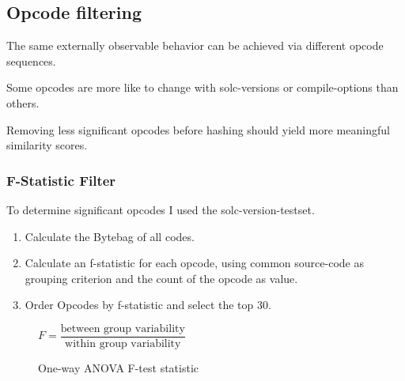 \documentclass[../main.tex]{subfiles}
\begin{document}
\subsection{Opcode filtering}
The same externally observable behavior can be achieved via different opcode sequences.

Some opcodes are more like to change with solc-versions or compile-options than others.

Removing less significant opcodes before hashing should yield more meaningful similarity scores.

\subsubsection{F-Statistic Filter}
To determine significant opcodes I used the solc-version-testset\cite{solc-versions-testset}.

\begin{enumerate}
  \item Calculate the Bytebag of all codes.
  \item Calculate an f-statistic for each opcode, using common source-code as grouping criterion and the count of the opcode as value.
  \item Order Opcodes by f-statistic and select the top 30.
\end{enumerate}

\begin{figure*}[ht!]
  \centering
  \begin{math}
    F = \dfrac{\textrm{between group variability}}{\textrm{within group variability}}
  \end{math}
  \caption{One-way ANOVA F-test statistic}
\end{figure*}
\end{document}
